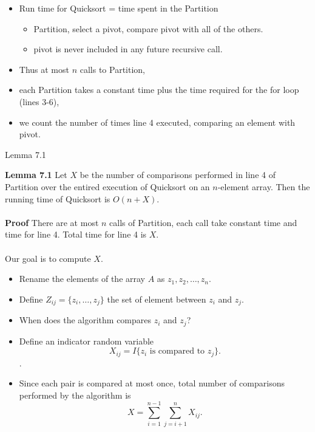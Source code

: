 \documentclass{beamer}
\begin{document}
\begin{frame}{}

\begin{itemize}
\item Run time for {\sc Quicksort} = time spent in the {\sc Partition}
\begin{itemize}
\item {\sc Partition}, select a pivot, compare pivot with all of the others. 
\item pivot is never included in any future recursive call. 
\end{itemize}
\item Thus at most $n$ calls to {\sc Partition}, 
\item each {\sc Partition} takes a constant time plus the time required for the for loop (lines 3-6),
\item we count the number of times line 4 executed, comparing an element with pivot. 
\end{itemize}
\end{frame}

\begin{frame}{Lemma 7.1}

{\bf Lemma 7.1} Let $X$ be the number of comparisons performed in line 4 of {\sc Partition} over the entired execution of {\sc Quicksort} on an $n$-element array. Then the running time of {\sc Quicksort} is $O(n+X)$. \\ \ \\
{\bf Proof} There are at most $n$ calls of {\sc Partition}, each call take constant time and time for line 4. Total time for line 4 is $X$. \ \\ \ \\
Our goal is to compute $X$. 
\end{frame}

\begin{frame}{}

\begin{itemize}
\item Rename the elements of the array $A$ as $z_1, z_2, \ldots, z_n$. 
\item Define $Z_{ij} = \{ z_i,\ldots, z_j\}$ the set of element between $z_i$ and $z_j$. 
\item When does the algorithm compares $z_i$ and $z_j$?
\item Define an indicator random variable $$X_{ij} = I \{ z_i \mbox{ is compared to } z_j\}.$$.
\item Since each pair is compared at most once, total number of comparisons performed by the algorithm is $$X=\sum_{i=1}^{n-1}\sum_{j=i+1}^nX_{ij}.$$
\end{itemize}
\end{frame}
\end{document}

